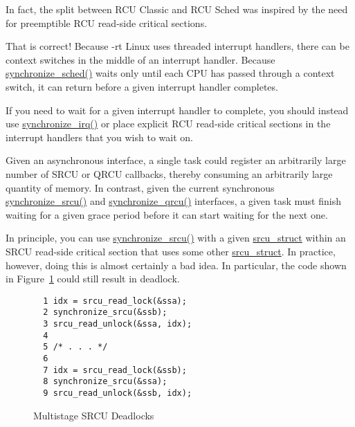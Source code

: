 	In fact, the split between RCU Classic and RCU Sched was inspired
	by the need for preemptible RCU read-side critical sections.


	That is correct!
	Because -rt Linux uses threaded interrupt handlers, there can
	be context switches in the middle of an interrupt handler.
	Because \url{synchronize_sched()} waits only until each
	CPU has passed through a context switch, it can return
	before a given interrupt handler completes.

	If you need to wait for a given interrupt handler to complete,
	you should instead use \url{synchronize_irq()} or place
	explicit RCU read-side critical sections in the interrupt
	handlers that you wish to wait on.


Given an asynchronous interface, a single task
could register an arbitrarily large number of SRCU or QRCU callbacks,
thereby consuming an arbitrarily large quantity of memory.
In contrast, given the current synchronous
\url{synchronize_srcu()} and \url{synchronize_qrcu()}
interfaces, a given task must finish waiting for a given grace period
before it can start waiting for the next one.


In principle, you can use
\url{synchronize_srcu()} with a given \url{srcu_struct}
within an SRCU read-side critical section that uses some other
\url{srcu_struct}.
In practice, however, doing this is almost certainly a bad idea.
In particular, the code shown in
Figure~\ref{fig:defer:Multistage SRCU Deadlocks}
could still result in deadlock.

\begin{figure}[htbp]
{ \centering
\begin{verbatim}
  1 idx = srcu_read_lock(&ssa);
  2 synchronize_srcu(&ssb);
  3 srcu_read_unlock(&ssa, idx);
  4 
  5 /* . . . */
  6 
  7 idx = srcu_read_lock(&ssb);
  8 synchronize_srcu(&ssa);
  9 srcu_read_unlock(&ssb, idx);
\end{verbatim}
}
\caption{Multistage SRCU Deadlocks}
\label{fig:defer:Multistage SRCU Deadlocks}
\end{figure}



